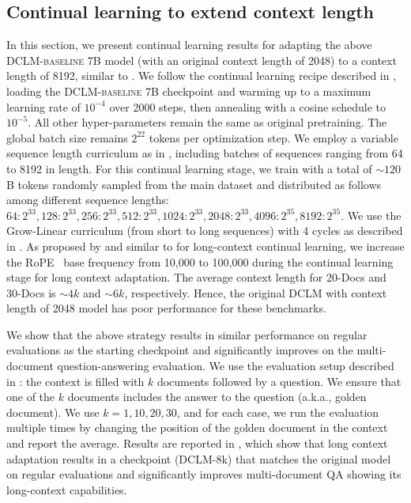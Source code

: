 \documentclass{article}
\newcommand{\hqpool}{\textsc{DCLM-baseline}\xspace}
\begin{document}
\subsection{Continual learning to extend context length}\label{appx:long-context}
In this section, we present continual learning results for adapting the above \hqpool 7B model (with an original context length of 2048) to a context length of 8192, similar to \citep{xiong2023effective}. We follow the continual learning recipe described in \citep{ibrahim2024simple}, loading the  \hqpool 7B checkpoint and warming up to a maximum learning rate of $10^{-4}$ over 2000 steps, then annealing with a cosine schedule to $10^{-5}$. All other hyper-parameters remain the same as original pretraining. The global batch size remains $2^{22}$ tokens per optimization step. We employ a variable sequence length curriculum as in \citep{pouransari2024dataset}, including batches of sequences ranging from 64 to 8192 in length. For this continual learning stage, we train with a total of $\sim 120$B tokens randomly sampled from the main dataset and distributed as follows among different sequence lengths: $64: 2^{33}, 128: 2^{33}, 256: 2^{33}, 512: 2^{33}, 1024: 2^{33}, 2048: 2^{33}, 4096: 2^{35}, 8192: 2^{35}$. We use the Grow-Linear curriculum (from short to long sequences) with 4 cycles as described in \citep{pouransari2024dataset}. As proposed by \citep{peng2023yarn} and similar to \citep{xiong2023effective} for long-context continual learning, we increase the RoPE~\citep{rope} base frequency from 10,000 to 100,000 during the continual learning stage for long context adaptation. The average context length for 20-Docs and 30-Docs is $\sim 4k$ and $\sim 6k$, respectively. Hence, the original DCLM with context length of 2048 model has poor performance for these benchmarks.

We show that the above strategy results in similar performance on regular evaluations as the starting checkpoint and significantly improves on the multi-document question-answering evaluation. We use the evaluation setup described in \citep{liu2024lost}: the context is filled with $k$ documents followed by a question. We ensure that one of the $k$ documents includes the answer to the question (a.k.a., golden document). We use $k=1, 10, 20, 30$, and for each case, we run the evaluation multiple times by changing the position of the golden document in the context and report the average. Results are reported in , which show that long context adaptation results in a checkpoint (DCLM-8k) that matches the original model on regular evaluations and significantly improves multi-document QA showing its long-context capabilities.
\end{document}
